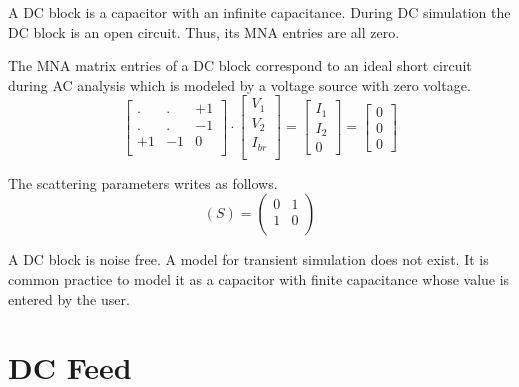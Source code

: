A DC block is a capacitor with an infinite capacitance. During DC
simulation the DC block is an open circuit. Thus, its MNA
entries are all zero.

\addvspace{12pt}

The MNA matrix entries of a DC block correspond to an ideal short
circuit during AC analysis which is modeled by a voltage source with
zero voltage.
\begin{equation}
\begin{bmatrix}
. & . & +1\\
. & . & -1\\
+1 & -1 & 0\\
\end{bmatrix}
\cdot
\begin{bmatrix}
V_1\\
V_2\\
I_{br}\\
\end{bmatrix}
=
\begin{bmatrix}
I_1\\
I_2\\
0
\end{bmatrix}
=
\begin{bmatrix}
0\\
0\\
0
\end{bmatrix}
\end{equation}

The scattering parameters writes as follows.
\begin{equation}
(S) =
\begin{pmatrix}
0 & 1\\
1 & 0\\
\end{pmatrix}
\end{equation}

A DC block is noise free. A model for transient simulation does not
exist. It is common practice to model it as a capacitor with finite
capacitance whose value is entered by the user.


\section{DC Feed}

